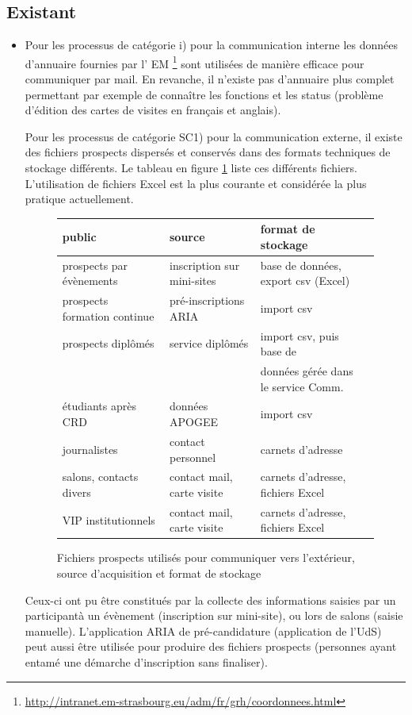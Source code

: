 \documentclass{book}
\begin{document}
\subsection{Existant}
\begin{itemize}
\item Pour les processus de catégorie i) pour la communication interne
	les données d'annuaire fournies par l' EM %
	\footnote{\url{http://intranet.em-strasbourg.eu/adm/fr/grh/coordonnees.html}}
	sont utilisées de manière efficace pour communiquer par mail.
	En revanche, il n'existe pas d'annuaire plus complet permettant
	par exemple de connaître les fonctions et les status (problème 
	d'édition des cartes de visites en français et anglais).


	Pour les processus de catégorie SC1) pour la communication externe,
	il existe des fichiers prospects dispersés et conservés dans des 
	formats techniques de stockage différents. Le tableau en figure 
	\ref{fg:comm_prospects} liste ces différents fichiers.
	L'utilisation de fichiers Excel est la plus courante et considérée 
	la plus pratique actuellement.

\begin{figure}[hbt]
\begin{center}
	\begin{tabular}{llll}
	\hline
	\hline
	public	& source	 & format de stockage \\
	\hline
	prospects par évènements & inscription sur  mini-sites &  base de données, export csv (Excel)\\
	prospects formation continue  & pré-inscriptions ARIA & import csv \\
	prospects diplômés      & service diplômés &  import csv, puis base de \\
					&			 &  données gérée dans le service Comm. \\
	étudiants après CRD 	& données APOGEE & import csv \\
	journalistes 		& contact personnel	& carnets d'adresse \\
	salons, contacts divers	& contact mail, carte visite & carnets d'adresse, fichiers Excel\\ 
	VIP institutionnels	& contact mail, carte visite & carnets d'adresse, fichiers Excel\\ 
	\hline
	\hline
	\end{tabular}
\end{center}
\caption{Fichiers prospects utilisés pour communiquer vers l'extérieur, source 
	d'acquisition et format de stockage}
\label{fg:comm_prospects}
\end{figure}
	Ceux-ci  ont pu être constitués par la collecte des informations saisies 
	par un participantà un évènement (inscription sur mini-site), ou lors de 
      salons (saisie manuelle). L'application ARIA de pré-candidature 
	(application de l'UdS) peut aussi être utilisée pour produire des 
	fichiers prospects (personnes ayant entamé une démarche d'inscription 
	sans finaliser).


\end{itemize}
\end{document}
